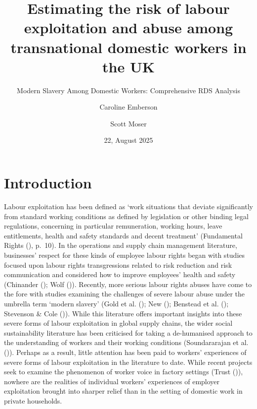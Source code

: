 \documentclass[
  12pt,
]{article}
\title{Estimating the risk of labour exploitation and abuse among
transnational domestic workers in the UK}
\subtitle{Modern Slavery Among Domestic Workers: Comprehensive RDS
Analysis}
\author{Caroline Emberson \and Scott Moser}
\date{22, August 2025}
\theoremstyle{plain}
\theoremstyle{definition}
\renewcommand*\contentsname{Table of contents}
\newcommand\contentsname{Table of contents}
\begin{document}
\maketitle

\renewcommand*\contentsname{Table of contents}
{
\hypersetup{linkcolor=}
\setcounter{tocdepth}{3}
\tableofcontents
}

\newpage

\section{Introduction}\label{introduction}

Labour exploitation has been defined as `work situations that deviate
significantly from standard working conditions as defined by legislation
or other binding legal regulations, concerning in particular
remuneration, working hours, leave entitlements, health and safety
standards and decent treatment' (Fundamental Rights
(),
p.~10). In the operations and supply chain management literature,
businesses' respect for these kinds of employee labour rights began with
studies focused upon labour rights transgressions related to risk
reduction and risk communication and considered how to improve
employees' health and safety (Chinander
(); Wolf
()). Recently, more
serious labour rights abuses have come to the fore with studies
examining the challenges of severe labour abuse under the umbrella term
`modern slavery' (Gold et al. ();
New (); Benstead et al.
(); Stevenson \& Cole
()). While this literature
offers important insights into these severe forms of labour exploitation
in global supply chains, the wider social sustainability literature has
been criticised for taking a de-humanised approach to the understanding
of workers and their working conditions (Soundararajan et al.
()). Perhaps as a
result, little attention has been paid to workers' experiences of severe
forms of labour exploitation in the literature to date. While recent
projects seek to examine the phenomenon of worker voice in factory
settings (Trust ()),
nowhere are the realities of individual workers' experiences of employer
exploitation brought into sharper relief than in the setting of domestic
work in private households.
\end{document}
